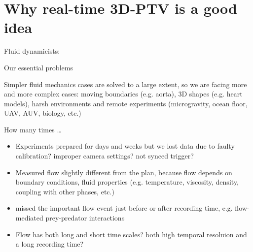 
\section{Why real-time 3D-PTV is a good idea}

\begin{frame}[label=why-1]{Fluid dynamicists: }
    \centering{}
\end{frame}


\begin{frame}[label=why-3]{Our essential problems}
\begin{card}
    Simpler fluid mechanics cases are solved to a large extent, so we are facing more and more complex cases: 
    moving boundaries (e.g. aorta), 3D shapes (e.g. heart models), harsh environments and remote experiments (microgravity, ocean floor, UAV, AUV, biology, etc.)
\end{card}
\end{frame}

\begin{frame}[label=why-3a]{How many times \ldots }
\begin{itemize}
    \item Experiments prepared for days and weeks but we lost data due to faulty calibration? improper camera settings? not synced trigger? 
    \item Measured flow slightly different from the plan, because flow depends on boundary conditions, fluid properties (e.g. temperature, viscosity, density, coupling with other phases, etc.)

    \item missed the important flow event just before or after recording time, e.g. flow-mediated prey-predator interactions
    \item Flow has both long and short time scales? both high temporal resoluion and a long recording time? 
\end{itemize}
\end{frame}


